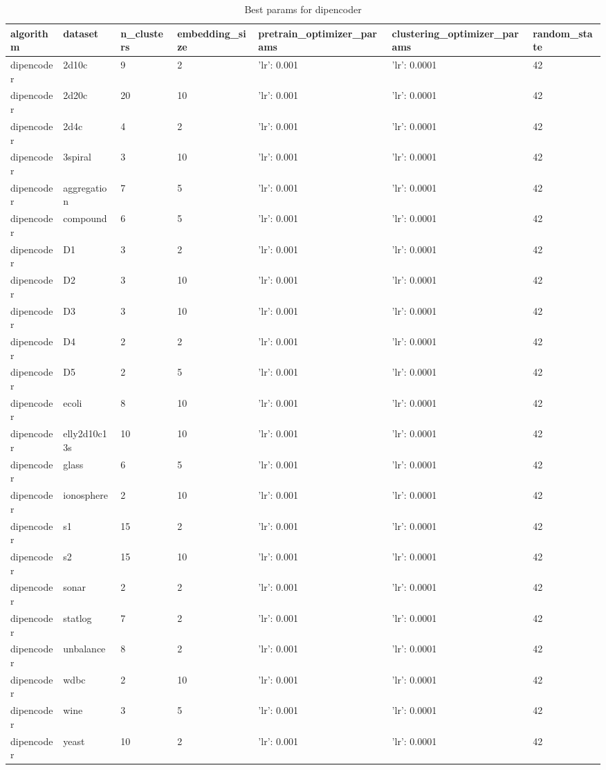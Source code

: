 \clearpage

\begin{table}[H]
\centering
\caption{Best params for dipencoder}
\label{S22_Table}
\begin{tabular}{|l|l|l|l|l|l|l|}
\hline
algorithm & dataset & n\_clusters & embedding\_size & pretrain\_optimizer\_params & clustering\_optimizer\_params & random\_state \\
\hline
dipencoder & 2d10c & 9 & 2 & {'lr': 0.001} & {'lr': 0.0001} & 42 \\
\hline
dipencoder & 2d20c & 20 & 10 & {'lr': 0.001} & {'lr': 0.0001} & 42 \\
\hline
dipencoder & 2d4c & 4 & 2 & {'lr': 0.001} & {'lr': 0.0001} & 42 \\
\hline
dipencoder & 3spiral & 3 & 10 & {'lr': 0.001} & {'lr': 0.0001} & 42 \\
\hline
dipencoder & aggregation & 7 & 5 & {'lr': 0.001} & {'lr': 0.0001} & 42 \\
\hline
dipencoder & compound & 6 & 5 & {'lr': 0.001} & {'lr': 0.0001} & 42 \\
\hline
dipencoder & D1 & 3 & 2 & {'lr': 0.001} & {'lr': 0.0001} & 42 \\
\hline
dipencoder & D2 & 3 & 10 & {'lr': 0.001} & {'lr': 0.0001} & 42 \\
\hline
dipencoder & D3 & 3 & 10 & {'lr': 0.001} & {'lr': 0.0001} & 42 \\
\hline
dipencoder & D4 & 2 & 2 & {'lr': 0.001} & {'lr': 0.0001} & 42 \\
\hline
dipencoder & D5 & 2 & 5 & {'lr': 0.001} & {'lr': 0.0001} & 42 \\
\hline
dipencoder & ecoli & 8 & 10 & {'lr': 0.001} & {'lr': 0.0001} & 42 \\
\hline
dipencoder & elly2d10c13s & 10 & 10 & {'lr': 0.001} & {'lr': 0.0001} & 42 \\
\hline
dipencoder & glass & 6 & 5 & {'lr': 0.001} & {'lr': 0.0001} & 42 \\
\hline
dipencoder & ionosphere & 2 & 10 & {'lr': 0.001} & {'lr': 0.0001} & 42 \\
\hline
dipencoder & s1 & 15 & 2 & {'lr': 0.001} & {'lr': 0.0001} & 42 \\
\hline
dipencoder & s2 & 15 & 10 & {'lr': 0.001} & {'lr': 0.0001} & 42 \\
\hline
dipencoder & sonar & 2 & 2 & {'lr': 0.001} & {'lr': 0.0001} & 42 \\
\hline
dipencoder & statlog & 7 & 2 & {'lr': 0.001} & {'lr': 0.0001} & 42 \\
\hline
dipencoder & unbalance & 8 & 2 & {'lr': 0.001} & {'lr': 0.0001} & 42 \\
\hline
dipencoder & wdbc & 2 & 10 & {'lr': 0.001} & {'lr': 0.0001} & 42 \\
\hline
dipencoder & wine & 3 & 5 & {'lr': 0.001} & {'lr': 0.0001} & 42 \\
\hline
dipencoder & yeast & 10 & 2 & {'lr': 0.001} & {'lr': 0.0001} & 42 \\
\hline
\end{tabular}
\end{table}

